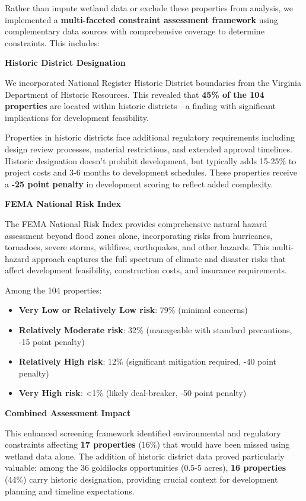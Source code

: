 \documentclass[
  letterpaper,
  DIV=11,
  numbers=noendperiod,
  oneside]{scrreprt}
\providecommand{\tightlist}{%
  \setlength{\itemsep}{0pt}\setlength{\parskip}{0pt}}
\begin{document}
Rather than impute wetland data or exclude these properties from
analysis, we implemented a \textbf{multi-faceted constraint assessment
framework} using complementary data sources with comprehensive coverage
to determine constraints. This includes:

\textbf{Historic District Designation}

We incorporated National Register Historic District boundaries from the
Virginia Department of Historic Resources. This revealed that
\textbf{45\% of the 104 properties} are located within historic
districts---a finding with significant implications for development
feasibility.

Properties in historic districts face additional regulatory requirements
including design review processes, material restrictions, and extended
approval timelines. Historic designation doesn't prohibit development,
but typically adds 15-25\% to project costs and 3-6 months to
development schedules. These properties receive a \textbf{-25 point
penalty} in development scoring to reflect added complexity.

\textbf{FEMA National Risk Index}

The FEMA National Risk Index provides comprehensive natural hazard
assessment beyond flood zones alone, incorporating risks from
hurricanes, tornadoes, severe storms, wildfires, earthquakes, and other
hazards. This multi-hazard approach captures the full spectrum of
climate and disaster risks that affect development feasibility,
construction costs, and insurance requirements.

Among the 104 properties:

\begin{itemize}
\tightlist
\item
  \textbf{Very Low or Relatively Low risk}: 79\% (minimal concerns)
\item
  \textbf{Relatively Moderate risk}: 32\% (manageable with standard
  precautions, -15 point penalty)
\item
  \textbf{Relatively High risk}: 12\% (significant mitigation required,
  -40 point penalty)
\item
  \textbf{Very High risk}: \textless1\% (likely deal-breaker, -50 point
  penalty)
\end{itemize}

\textbf{Combined Assessment Impact}

This enhanced screening framework identified environmental and
regulatory constraints affecting \textbf{17 properties} (16\%) that
would have been missed using wetland data alone. The addition of
historic district data proved particularly valuable: among the 36
goldilocks opportunities (0.5-5 acres), \textbf{16 properties} (44\%)
carry historic designation, providing crucial context for development
planning and timeline expectations.
\end{document}
